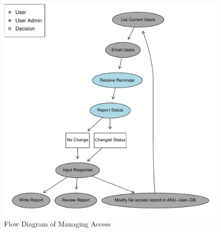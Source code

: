 \documentclass[a4paper]{article}
\begin{document}
\begin{figure}[!h]
\centering
\includegraphics[width=1.4\textwidth]{DataAccessFlowDiagram-ManagingAccess.pdf}
\caption{Flow Diagram of Managing Access}
\label{fig:DataAccessFlowDiagram-ManagingAccess}
\end{figure}
\clearpage
\end{document}
